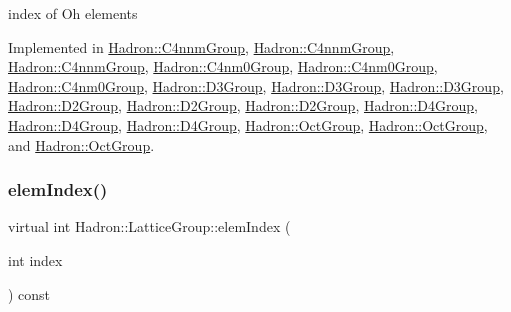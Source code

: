 index of Oh elements 

Implemented in \mbox{\hyperlink{structHadron_1_1C4nnmGroup_a8cbcb161ddf801e759797f231db35f75}{Hadron\+::\+C4nnm\+Group}}, \mbox{\hyperlink{structHadron_1_1C4nnmGroup_a8cbcb161ddf801e759797f231db35f75}{Hadron\+::\+C4nnm\+Group}}, \mbox{\hyperlink{structHadron_1_1C4nnmGroup_a8cbcb161ddf801e759797f231db35f75}{Hadron\+::\+C4nnm\+Group}}, \mbox{\hyperlink{structHadron_1_1C4nm0Group_a700a48f1865a634b774127d8710e1ecc}{Hadron\+::\+C4nm0\+Group}}, \mbox{\hyperlink{structHadron_1_1C4nm0Group_a700a48f1865a634b774127d8710e1ecc}{Hadron\+::\+C4nm0\+Group}}, \mbox{\hyperlink{structHadron_1_1C4nm0Group_a700a48f1865a634b774127d8710e1ecc}{Hadron\+::\+C4nm0\+Group}}, \mbox{\hyperlink{structHadron_1_1D3Group_a90ac88df35dd8e919637917dc22ee903}{Hadron\+::\+D3\+Group}}, \mbox{\hyperlink{structHadron_1_1D3Group_a90ac88df35dd8e919637917dc22ee903}{Hadron\+::\+D3\+Group}}, \mbox{\hyperlink{structHadron_1_1D3Group_a90ac88df35dd8e919637917dc22ee903}{Hadron\+::\+D3\+Group}}, \mbox{\hyperlink{structHadron_1_1D2Group_aa7676a51e002eb654648c4d84585d6da}{Hadron\+::\+D2\+Group}}, \mbox{\hyperlink{structHadron_1_1D2Group_aa7676a51e002eb654648c4d84585d6da}{Hadron\+::\+D2\+Group}}, \mbox{\hyperlink{structHadron_1_1D2Group_aa7676a51e002eb654648c4d84585d6da}{Hadron\+::\+D2\+Group}}, \mbox{\hyperlink{structHadron_1_1D4Group_aa4ca8a3f1bc6774b630cd6a354179298}{Hadron\+::\+D4\+Group}}, \mbox{\hyperlink{structHadron_1_1D4Group_aa4ca8a3f1bc6774b630cd6a354179298}{Hadron\+::\+D4\+Group}}, \mbox{\hyperlink{structHadron_1_1D4Group_aa4ca8a3f1bc6774b630cd6a354179298}{Hadron\+::\+D4\+Group}}, \mbox{\hyperlink{structHadron_1_1OctGroup_a1410a74894e1d12337548245c4e6fd47}{Hadron\+::\+Oct\+Group}}, \mbox{\hyperlink{structHadron_1_1OctGroup_a1410a74894e1d12337548245c4e6fd47}{Hadron\+::\+Oct\+Group}}, and \mbox{\hyperlink{structHadron_1_1OctGroup_a1410a74894e1d12337548245c4e6fd47}{Hadron\+::\+Oct\+Group}}.

\mbox{\label{structHadron_1_1LatticeGroup_afb8e3ee60de059f75bce1044c694e1e8}} 
\subsubsection{\texorpdfstring{elemIndex()}{elemIndex()}\hspace{0.1cm}{\footnotesize\ttfamily [3/3]}}
{\footnotesize\ttfamily virtual int Hadron\+::\+Lattice\+Group\+::elem\+Index (\begin{DoxyParamCaption}\item[{int}]{index }\end{DoxyParamCaption}) const\hspace{0.3cm}{\ttfamily [pure virtual]}}

